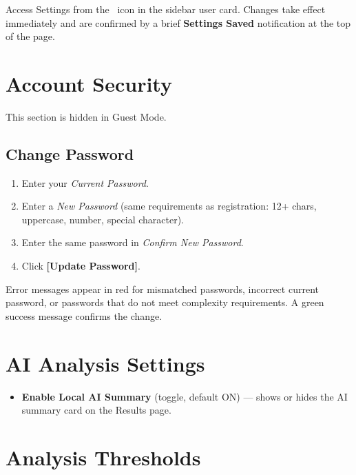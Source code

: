 \documentclass[12pt,a4paper]{report}
\newcommand{\btn}[1]{\textbf{\textcolor{primary}{[#1]}}}
\newcommand{\field}[1]{\textit{#1}}
\newcommand{\badge}[2]{\colorbox{#1!20}{\textcolor{#1!70!black}{\small\textbf{#2}}}}
\begin{document}
Access Settings from the \faCog\ icon in the sidebar user card. Changes take effect immediately and are confirmed by a brief \badge{success}{Settings Saved} notification at the top of the page.

\section{Account Security}

\begin{notebox}
  This section is hidden in Guest Mode.
\end{notebox}

\subsection{Change Password}

\begin{enumerate}[leftmargin=1.5em]
  \item Enter your \field{Current Password}.
  \item Enter a \field{New Password} (same requirements as registration: 12+ chars, uppercase, number, special character).
  \item Enter the same password in \field{Confirm New Password}.
  \item Click \btn{Update Password}.
\end{enumerate}

Error messages appear in red for mismatched passwords, incorrect current password, or passwords that do not meet complexity requirements. A green success message confirms the change.

\section{AI Analysis Settings}

\begin{itemize}[leftmargin=1.5em]
  \item \textbf{Enable Local AI Summary} (toggle, default ON) — shows or hides the AI summary card on the Results page.
\end{itemize}

\section{Analysis Thresholds}
\end{document}
